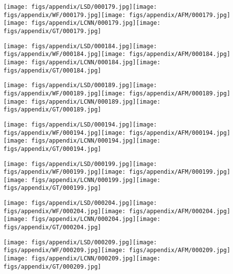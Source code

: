 \documentclass[10pt,twocolumn,letterpaper]{article}
\begin{document}
\texttt{[image: figs/appendix/LSD/000179.jpg]}\texttt{[image: figs/appendix/WF/000179.jpg]}\texttt{[image: figs/appendix/AFM/000179.jpg]}\texttt{[image: figs/appendix/LCNN/000179.jpg]}\texttt{[image: figs/appendix/GT/000179.jpg]}

\texttt{[image: figs/appendix/LSD/000184.jpg]}\texttt{[image: figs/appendix/WF/000184.jpg]}\texttt{[image: figs/appendix/AFM/000184.jpg]}\texttt{[image: figs/appendix/LCNN/000184.jpg]}\texttt{[image: figs/appendix/GT/000184.jpg]}

\texttt{[image: figs/appendix/LSD/000189.jpg]}\texttt{[image: figs/appendix/WF/000189.jpg]}\texttt{[image: figs/appendix/AFM/000189.jpg]}\texttt{[image: figs/appendix/LCNN/000189.jpg]}\texttt{[image: figs/appendix/GT/000189.jpg]}

\texttt{[image: figs/appendix/LSD/000194.jpg]}\texttt{[image: figs/appendix/WF/000194.jpg]}\texttt{[image: figs/appendix/AFM/000194.jpg]}\texttt{[image: figs/appendix/LCNN/000194.jpg]}\texttt{[image: figs/appendix/GT/000194.jpg]}

\texttt{[image: figs/appendix/LSD/000199.jpg]}\texttt{[image: figs/appendix/WF/000199.jpg]}\texttt{[image: figs/appendix/AFM/000199.jpg]}\texttt{[image: figs/appendix/LCNN/000199.jpg]}\texttt{[image: figs/appendix/GT/000199.jpg]}

\texttt{[image: figs/appendix/LSD/000204.jpg]}\texttt{[image: figs/appendix/WF/000204.jpg]}\texttt{[image: figs/appendix/AFM/000204.jpg]}\texttt{[image: figs/appendix/LCNN/000204.jpg]}\texttt{[image: figs/appendix/GT/000204.jpg]}

\texttt{[image: figs/appendix/LSD/000209.jpg]}\texttt{[image: figs/appendix/WF/000209.jpg]}\texttt{[image: figs/appendix/AFM/000209.jpg]}\texttt{[image: figs/appendix/LCNN/000209.jpg]}\texttt{[image: figs/appendix/GT/000209.jpg]}
\end{document}
